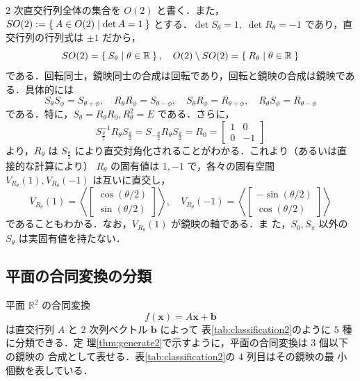 \documentclass[11pt, uplatex, dvipdfmx, titlepage]{jsarticle}
\theoremstyle{definition}
\begin{document}
$2$ 次直交行列全体の集合を $O(2)$ と書く．また，$SO(2) := \Set{A \in
  O(2) | \det A = 1}$ とする．$\det S_{\theta} =1, \; \det
R_{\theta}=-1$ であり，直交行列の行列式は $\pm 1$ だから，
\[
  SO(2) = \Set{ S_{\theta} | \theta \in \mathbb{R}}, \quad O(2)
  \setminus SO(2)=\Set{ R_{\theta} | \theta \in \mathbb{R}}
\]
である．回転同士，鏡映同士の合成は回転であり，回転と鏡映の合成は鏡映である．具体的には
\[
  S_{\theta} S_{\phi} = S_{\theta+\phi}, \quad R_{\theta} R_{\phi} = S_{\theta-\phi}, \quad
  S_{\theta}R_{\phi}=R_{\theta+\phi}, \quad R_{\theta}S_{\phi} = R_{\theta-\phi}
\]
である．特に，$S_{\theta} = R_{\theta}R_{0}, R_{\theta}^2=E$ である．さらに，
\[
  S_{\frac{\theta}{2}}^{-1} R_{\theta} S_{\frac{\theta}{2}} = S_{-\frac{\theta}{2}} R_{\theta} S_{\frac{\theta}{2}}
  = R_{0} = \left[
    \begin{array}{rr}
      1 & 0\\
      0 & -1
    \end{array}
  \right]
\]
より，$R_{\theta}$ は $S_{\frac{\theta}{2}}$ により直交対角化されることがわかる．これより（あるいは直接的な計算により）
$R_{\theta}$ の固有値は $1, -1$ で，各々の固有空間 $V_{R_{\theta}}(1), V_{R_{\theta}}(-1)$ は互いに直交し，
\[
  V_{R_{\theta}}(1) = \left\langle \left[
    \begin{array}{r}
      \cos (\theta/2)\\
      \sin (\theta/2)
    \end{array}
  \right]\right\rangle, \quad V_{R_{\theta}}(-1)= \left\langle \left[
    \begin{array}{r}
      -\sin (\theta/2)\\
      \cos (\theta/2)
    \end{array}
  \right]\right\rangle
\] 
であることもわかる．なお，$V_{R_{\theta}}(1)$ が鏡映の軸である．ま
た，$S_0, S_{\pi}$ 以外の $S_{\theta}$ は実固有値を持たない．


\subsection{平面の合同変換の分類}\label{sec:classification2}

平面 $\mathbb{R}^2$ の合同変換
\[
  f(\bm{x}) = A \bm{x} + \bm{b}
\]
は直交行列 $A$ と $2$ 次列ベクトル $\bm{b}$ によって
表\ref{tab:classification2}のように $5$ 種に分類できる．定
理\ref{thm:generate2}で示すように，平面の合同変換は $3$ 個以下の鏡映の
合成として表せる．表\ref{tab:classification2}の $4$ 列目はその鏡映の最
小個数を表している．
\end{document}
